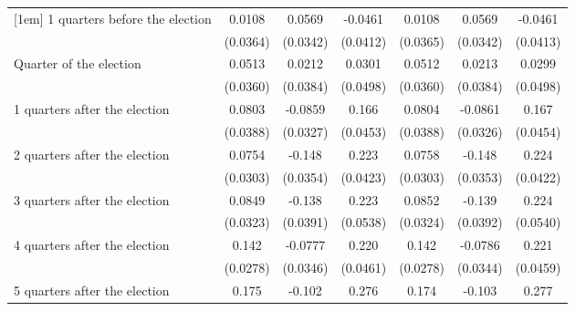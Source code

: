 \begin{table}[!ht]
\begin{tabular}{l*{6}{c}}
[1em]
 1 quarters before the election&      0.0108         &      0.0569         &     -0.0461         &      0.0108         &      0.0569         &     -0.0461         \\
                    &    (0.0364)         &    (0.0342)         &    (0.0412)         &    (0.0365)         &    (0.0342)         &    (0.0413)         \\
[1em]
Quarter of the election&      0.0513         &      0.0212         &      0.0301         &      0.0512         &      0.0213         &      0.0299         \\
                    &    (0.0360)         &    (0.0384)         &    (0.0498)         &    (0.0360)         &    (0.0384)         &    (0.0498)         \\
[1em]
 1 quarters after the election&      0.0803\sym{*}  &     -0.0859\sym{**} &       0.166\sym{***}&      0.0804\sym{*}  &     -0.0861\sym{**} &       0.167\sym{***}\\
                    &    (0.0388)         &    (0.0327)         &    (0.0453)         &    (0.0388)         &    (0.0326)         &    (0.0454)         \\
[1em]
 2 quarters after the election&      0.0754\sym{*}  &      -0.148\sym{***}&       0.223\sym{***}&      0.0758\sym{*}  &      -0.148\sym{***}&       0.224\sym{***}\\
                    &    (0.0303)         &    (0.0354)         &    (0.0423)         &    (0.0303)         &    (0.0353)         &    (0.0422)         \\
[1em]
 3 quarters after the election&      0.0849\sym{**} &      -0.138\sym{***}&       0.223\sym{***}&      0.0852\sym{**} &      -0.139\sym{***}&       0.224\sym{***}\\
                    &    (0.0323)         &    (0.0391)         &    (0.0538)         &    (0.0324)         &    (0.0392)         &    (0.0540)         \\
[1em]
 4 quarters after the election&       0.142\sym{***}&     -0.0777\sym{*}  &       0.220\sym{***}&       0.142\sym{***}&     -0.0786\sym{*}  &       0.221\sym{***}\\
                    &    (0.0278)         &    (0.0346)         &    (0.0461)         &    (0.0278)         &    (0.0344)         &    (0.0459)         \\
[1em]
 5 quarters after the election&       0.175\sym{***}&      -0.102\sym{**} &       0.276\sym{***}&       0.174\sym{***}&      -0.103\sym{**} &       0.277\sym{***}\\

\end{tabular}
\end{table}
